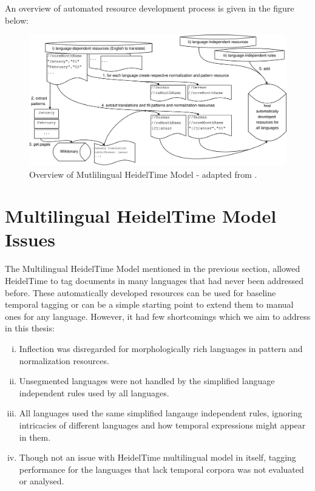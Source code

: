 An overview of automated resource development process is given in the figure below:  
\begin{figure}[H] 
	\centering
	\includegraphics[width=14cm]{Graphics/ht-multilingual}
	\caption{Overview of Mutlilingual HeidelTime Model - adapted from \cite{DBLP:conf/emnlp/StrotgenG15}.}
	\label{figure:3d}
\end{figure}



\section{Multilingual HeidelTime Model Issues} \label{improved-multilingual-ht-model}
The Multilingual HeidelTime Model mentioned in the previous section, allowed HeidelTime to tag documents in many languages that had never been addressed before. These automatically developed resources can be used for baseline temporal tagging or can be a simple starting point to extend them to manual ones for any language. However, it had few shortcomings which we aim to address in this thesis: 

\begin{enumerate}[i.]
	\item Inflection was disregarded for morphologically rich languages in pattern and normalization resources.
	\item Unsegmented languages were not handled by the simplified language independent rules used by all languages.
	\item All languages used the same simplified langauge independent rules, ignoring intricacies of different languages and how temporal expressions might appear in them.
	\item Though not an issue with HeidelTime multilingual model in itself, tagging performance for the languages that lack temporal corpora was not evaluated or analysed.
\end{enumerate}

